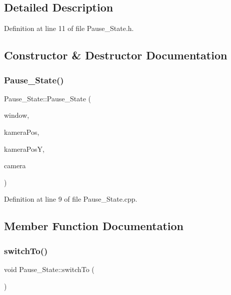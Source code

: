 \subsection{Detailed Description}


Definition at line 11 of file Pause\+\_\+\+State.\+h.



\subsection{Constructor \& Destructor Documentation}
\hypertarget{class_pause___state_ae8b4398b9723bd5b1eb44bd8ee3c2010}{}\label{class_pause___state_ae8b4398b9723bd5b1eb44bd8ee3c2010} 
\subsubsection{\texorpdfstring{Pause\+\_\+\+State()}{Pause\_State()}}
{\footnotesize\ttfamily Pause\+\_\+\+State\+::\+Pause\+\_\+\+State (\begin{DoxyParamCaption}\item[{sf\+::\+Render\+Window \&}]{window,  }\item[{int}]{kamera\+Pos,  }\item[{int}]{kamera\+PosY,  }\item[{sf\+::\+View \&}]{camera }\end{DoxyParamCaption})}



Definition at line 9 of file Pause\+\_\+\+State.\+cpp.



\subsection{Member Function Documentation}
\hypertarget{class_pause___state_a82ea36a367fb5be23bc87c701df11cb5}{}\label{class_pause___state_a82ea36a367fb5be23bc87c701df11cb5} 
\subsubsection{\texorpdfstring{switch\+To()}{switchTo()}}
{\footnotesize\ttfamily void Pause\+\_\+\+State\+::switch\+To (\begin{DoxyParamCaption}{ }\end{DoxyParamCaption})}



